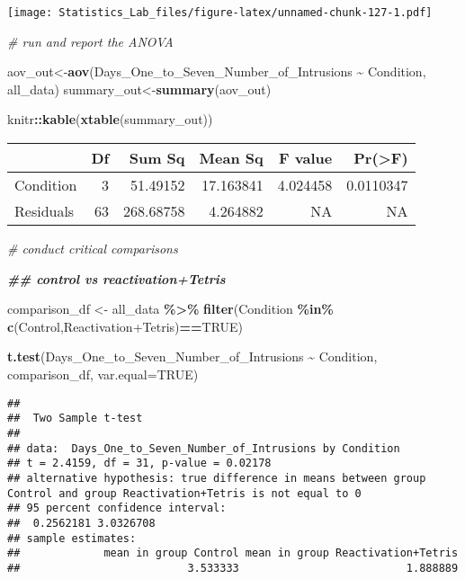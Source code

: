 \documentclass[
]{book}
\newenvironment{Shaded}{\begin{snugshade}}{\end{snugshade}}
\newcommand{\AttributeTok}[1]{\textcolor[rgb]{0.13,0.29,0.53}{#1}}
\newcommand{\CommentTok}[1]{\textcolor[rgb]{0.56,0.35,0.01}{\textit{#1}}}
\newcommand{\ConstantTok}[1]{\textcolor[rgb]{0.56,0.35,0.01}{#1}}
\newcommand{\DocumentationTok}[1]{\textcolor[rgb]{0.56,0.35,0.01}{\textbf{\textit{#1}}}}
\newcommand{\FunctionTok}[1]{\textcolor[rgb]{0.13,0.29,0.53}{\textbf{#1}}}
\newcommand{\NormalTok}[1]{#1}
\newcommand{\OtherTok}[1]{\textcolor[rgb]{0.56,0.35,0.01}{#1}}
\newcommand{\SpecialCharTok}[1]{\textcolor[rgb]{0.81,0.36,0.00}{\textbf{#1}}}
\newcommand{\StringTok}[1]{\textcolor[rgb]{0.31,0.60,0.02}{#1}}
\begin{document}
\texttt{[image: Statistics\_Lab\_files/figure-latex/unnamed-chunk-127-1.pdf]}

\begin{Shaded}
\begin{Highlighting}[]
\CommentTok{\# run and report the ANOVA}

\NormalTok{aov\_out}\OtherTok{\textless{}{-}}\FunctionTok{aov}\NormalTok{(Days\_One\_to\_Seven\_Number\_of\_Intrusions }\SpecialCharTok{\textasciitilde{}}\NormalTok{ Condition, all\_data)}
\NormalTok{summary\_out}\OtherTok{\textless{}{-}}\FunctionTok{summary}\NormalTok{(aov\_out)}

\NormalTok{knitr}\SpecialCharTok{::}\FunctionTok{kable}\NormalTok{(}\FunctionTok{xtable}\NormalTok{(summary\_out))}
\end{Highlighting}
\end{Shaded}

\begin{tabular}{l|r|r|r|r|r}
\hline
  & Df & Sum Sq & Mean Sq & F value & Pr(>F)\\
\hline
Condition & 3 & 51.49152 & 17.163841 & 4.024458 & 0.0110347\\
\hline
Residuals & 63 & 268.68758 & 4.264882 & NA & NA\\
\hline
\end{tabular}

\begin{Shaded}
\begin{Highlighting}[]
\CommentTok{\# conduct critical comparisons}

\DocumentationTok{\#\# control vs reactivation+Tetris}

\NormalTok{comparison\_df }\OtherTok{\textless{}{-}}\NormalTok{ all\_data }\SpecialCharTok{\%\textgreater{}\%} 
                  \FunctionTok{filter}\NormalTok{(Condition }\SpecialCharTok{\%in\%} \FunctionTok{c}\NormalTok{(}\StringTok{\textquotesingle{}Control\textquotesingle{}}\NormalTok{,}\StringTok{\textquotesingle{}Reactivation+Tetris\textquotesingle{}}\NormalTok{)}\SpecialCharTok{==}\ConstantTok{TRUE}\NormalTok{)}
                        
\FunctionTok{t.test}\NormalTok{(Days\_One\_to\_Seven\_Number\_of\_Intrusions }\SpecialCharTok{\textasciitilde{}}\NormalTok{ Condition, }
\NormalTok{       comparison\_df,}
       \AttributeTok{var.equal=}\ConstantTok{TRUE}\NormalTok{)}
\end{Highlighting}
\end{Shaded}

\begin{verbatim}
## 
##  Two Sample t-test
## 
## data:  Days_One_to_Seven_Number_of_Intrusions by Condition
## t = 2.4159, df = 31, p-value = 0.02178
## alternative hypothesis: true difference in means between group Control and group Reactivation+Tetris is not equal to 0
## 95 percent confidence interval:
##  0.2562181 3.0326708
## sample estimates:
##             mean in group Control mean in group Reactivation+Tetris 
##                          3.533333                          1.888889
\end{verbatim}
\end{document}
